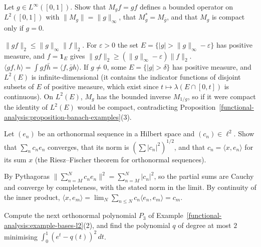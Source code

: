 \begin{exercise}\label{functional-analysis:exercise-multiplication-operator}
Let $g \in L^\infty([0, 1])$. Show that $M_gf = gf$ defines a bounded operator on $L^2([0, 1])$ with $\|M_g\| = \|g\|_\infty$, that $M_g^* = M_{\bar g}$, and that $M_g$ is compact only if $g = 0$.
\end{exercise}

\begin{solution}
$\|gf\|_2 \leq \|g\|_\infty\|f\|_2$. For $\varepsilon > 0$ the set $E = \{|g| > \|g\|_\infty - \varepsilon\}$ has positive measure, and $f = \mathbf{1}_E$ gives $\|gf\|_2 \geq (\|g\|_\infty - \varepsilon)\|f\|_2$.
$\langle gf, h\rangle = \int gf\bar h = \langle f, \bar gh\rangle$. If $g \neq 0$, some $E = \{|g| > \delta\}$ has positive measure, and $L^2(E)$ is infinite-dimensional (it contains the indicator functions
of disjoint subsets of $E$ of positive measure, which exist since $t \mapsto \lambda(E \cap [0, t])$ is continuous). On $L^2(E)$, $M_g$ has the bounded inverse $M_{1/g}$, so if it were compact the
identity of $L^2(E)$ would be compact, contradicting Proposition~\ref{functional-analysis:proposition-banach-examples}(3).
\end{solution}

\begin{exercise}\label{functional-analysis:exercise-bessel-equality}
Let $(e_n)$ be an orthonormal sequence in a Hilbert space and $(c_n) \in \ell^2$. Show that $\sum_nc_ne_n$ converges, that its norm is $(\sum|c_n|^2)^{1/2}$, and that $c_n = \langle x, e_n\rangle$ for its
sum $x$ (the Riesz--Fischer theorem for orthonormal sequences).
\end{exercise}

\begin{solution}
By Pythagoras $\|\sum_{n=M}^Nc_ne_n\|^2 = \sum_{n=M}^N|c_n|^2$, so the partial sums are Cauchy and converge by completeness, with the stated norm in the limit. By continuity of the inner product,
$\langle x, e_m\rangle = \lim_N\sum_{n \leq N}c_n\langle e_n, e_m\rangle = c_m$.
\end{solution}

\begin{exercise}\label{functional-analysis:exercise-legendre}
Compute the next orthonormal polynomial $P_3$ of Example~\ref{functional-analysis:example-bases-l2}(2), and find the polynomial $q$ of degree at most $2$ minimising $\int_0^1(e^t - q(t))^2\,dt$.
\end{exercise}

